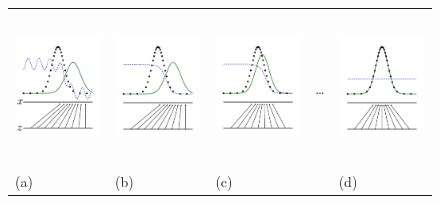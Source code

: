 \begin{figure}[h]
\begin{tabular}{m{3cm}m{3cm}m{3cm}m{0.1cm}m{3cm}}
    \includegraphics[width=3cm, height=4cm]{fig1.pdf} 
    &  
    \includegraphics[width=3cm, height=4cm]{fig2.pdf}
    & 
    \includegraphics[width=3cm, height=4cm]{fig3.pdf}
    &
    \dots
    &
    \includegraphics[width=3cm, height=4cm]{fig4.pdf}
    \\
    \centering (a)
    & 
    \centering (b) 
    & 
    \centering (c) 
    &  
    & 
    \centering (d)
\end{tabular}


\end{figure}
